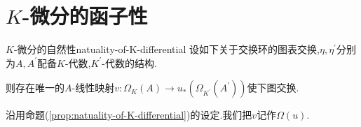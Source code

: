 \section{\texorpdfstring{$K$}{K}-微分的函子性}

\begin{proposition}{$K$-微分的自然性}{natuality-of-K-differential}
	设如下关于交换环的图表交换,$\eta,\eta^{\prime}$分别为$A,A^{\prime}$配备$K$-代数,$K^{\prime}$-代数的结构.
	\begin{center}
	\end{center}
	则存在唯一的$A$-线性映射$v:\Omega_{K}\left(A\right)\to u_{\ast}\left(\Omega_{K^{\prime}}\left(A^{\prime}\right)\right)$使下图交换.
	\begin{center}
	\end{center}
\end{proposition}

\begin{definition}{}{}
	沿用命题(\cref{prop:natuality-of-K-differential})的设定.我们把$v$记作$\Omega\left(u\right)$.
\end{definition}

